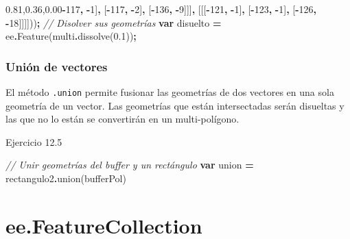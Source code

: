 \documentclass[
  12pt,
  letterpaper,
  twoside]{book}
\newenvironment{Shaded}{\begin{snugshade}}{\end{snugshade}}
\newcommand{\CommentTok}[1]{\textcolor[rgb]{0.56,0.35,0.01}{\textit{#1}}}
\newcommand{\DecValTok}[1]{\textcolor[rgb]{0.00,0.00,0.81}{#1}}
\newcommand{\FloatTok}[1]{\textcolor[rgb]{0.00,0.00,0.81}{#1}}
\newcommand{\FunctionTok}[1]{\textcolor[rgb]{0.00,0.00,0.00}{#1}}
\newcommand{\KeywordTok}[1]{\textcolor[rgb]{0.13,0.29,0.53}{\textbf{#1}}}
\newcommand{\NormalTok}[1]{#1}
\newcommand{\OperatorTok}[1]{\textcolor[rgb]{0.81,0.36,0.00}{\textbf{#1}}}
\begin{document}
\begin{Shaded}
\begin{Highlighting}[]
\NormalTok{             [[[}\OperatorTok{{-}}\DecValTok{117}\OperatorTok{,} \OperatorTok{{-}}\DecValTok{1}\NormalTok{]}\OperatorTok{,}
\NormalTok{               [}\OperatorTok{{-}}\DecValTok{117}\OperatorTok{,} \OperatorTok{{-}}\DecValTok{2}\NormalTok{]}\OperatorTok{,}
\NormalTok{               [}\OperatorTok{{-}}\DecValTok{136}\OperatorTok{,} \OperatorTok{{-}}\DecValTok{9}\NormalTok{]]]}\OperatorTok{,}
\NormalTok{             [[[}\OperatorTok{{-}}\DecValTok{121}\OperatorTok{,} \OperatorTok{{-}}\DecValTok{1}\NormalTok{]}\OperatorTok{,}
\NormalTok{               [}\OperatorTok{{-}}\DecValTok{123}\OperatorTok{,} \OperatorTok{{-}}\DecValTok{1}\NormalTok{]}\OperatorTok{,}
\NormalTok{               [}\OperatorTok{{-}}\DecValTok{126}\OperatorTok{,} \OperatorTok{{-}}\DecValTok{18}\NormalTok{]]]]))}\OperatorTok{;}
\CommentTok{// Disolver sus geometrías}
\KeywordTok{var}\NormalTok{ disuelto }\OperatorTok{=}\NormalTok{ ee}\OperatorTok{.}\FunctionTok{Feature}\NormalTok{(multi}\OperatorTok{.}\FunctionTok{dissolve}\NormalTok{(}\FloatTok{0.1}\NormalTok{))}\OperatorTok{;}
\end{Highlighting}
\end{Shaded}

\hypertarget{uniuxf3n-de-vectores}{%
\subsection{Unión de vectores}\label{uniuxf3n-de-vectores}}

El método \texttt{.union} permite fusionar las geometrías de dos vectores en una sola geometría de un vector. Las geometrías que están intersectadas serán disueltas y las que no lo están se convertirán en un multi-polígono.

Ejercicio 12.5

\begin{Shaded}
\begin{Highlighting}[]
\CommentTok{// Unir geometrías del buffer y un rectángulo }
\KeywordTok{var}\NormalTok{ union }\OperatorTok{=}\NormalTok{ rectangulo2}\OperatorTok{.}\FunctionTok{union}\NormalTok{(bufferPol)}
\end{Highlighting}
\end{Shaded}

\newpage

\hypertarget{ee.featurecollection}{%
\chapter{ee.FeatureCollection}\label{ee.featurecollection}}
\end{document}
